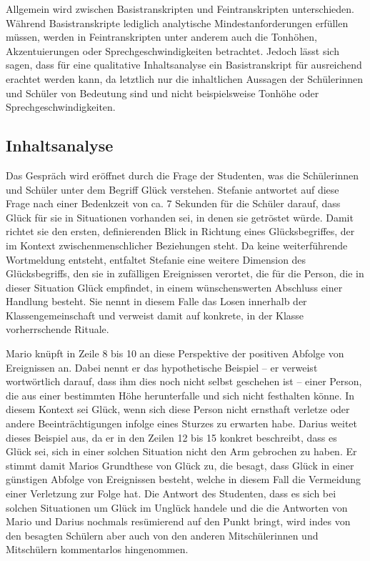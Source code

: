 Allgemein wird zwischen Basistranskripten und Feintranskripten unterschieden. 
Während Basistranskripte lediglich analytische Mindestanforderungen erfüllen müssen, werden in Feintranskripten unter anderem auch die Tonhöhen, Akzentuierungen oder Sprechgeschwindigkeiten betrachtet.
Jedoch lässt sich sagen, dass für eine qualitative Inhaltsanalyse ein Basistranskript für ausreichend erachtet werden kann, da letztlich nur die inhaltlichen Aussagen der Schülerinnen und Schüler von Bedeutung sind und nicht beispielsweise Tonhöhe oder Sprechgeschwindigkeiten.


\newpage


\subsection{Inhaltsanalyse}

Das Gespräch wird eröffnet durch die Frage der Studenten, was die Schülerinnen und Schüler unter dem Begriff Glück verstehen. 
Stefanie antwortet auf diese Frage nach einer Bedenkzeit von ca. 7 Sekunden für die Schüler darauf, dass Glück für sie in Situationen vorhanden sei, in denen sie getröstet würde. 
Damit richtet sie den ersten, definierenden Blick in Richtung eines Glücksbegriffes, der im Kontext zwischenmenschlicher Beziehungen steht. 
Da keine weiterführende Wortmeldung entsteht, entfaltet Stefanie eine weitere Dimension des Glücksbegriffs, den sie in zufälligen Ereignissen verortet, die für die Person, die in dieser Situation Glück empfindet, in einem wünschenswerten Abschluss einer Handlung besteht. 
Sie nennt in diesem Falle das Losen innerhalb der Klassengemeinschaft und verweist damit auf konkrete, in der Klasse vorherrschende Rituale. 

Mario knüpft in Zeile 8 bis 10 an diese Perspektive der positiven Abfolge von Ereignissen an. 
Dabei nennt er das hypothetische Beispiel -- er verweist wortwörtlich darauf, dass ihm dies noch nicht selbst geschehen ist -- einer Person, die aus einer bestimmten Höhe herunterfalle und sich nicht festhalten könne. 
In diesem Kontext sei Glück, wenn sich diese Person nicht ernsthaft verletze oder andere Beeinträchtigungen infolge eines Sturzes zu erwarten habe. 
Darius weitet dieses Beispiel aus, da er in den Zeilen 12 bis 15 konkret beschreibt, dass es Glück sei, sich in einer solchen Situation nicht den Arm gebrochen zu haben.
Er stimmt damit Marios Grundthese von Glück zu, die besagt, dass Glück in einer günstigen Abfolge von Ereignissen besteht, welche in diesem Fall die Vermeidung einer Verletzung zur Folge hat. 
Die Antwort des Studenten, dass es sich bei solchen Situationen um Glück im Unglück handele und die die Antworten von Mario und Darius nochmals resümierend auf den Punkt bringt, wird indes von den besagten Schülern aber auch von den anderen Mitschülerinnen und Mitschülern kommentarlos hingenommen.


